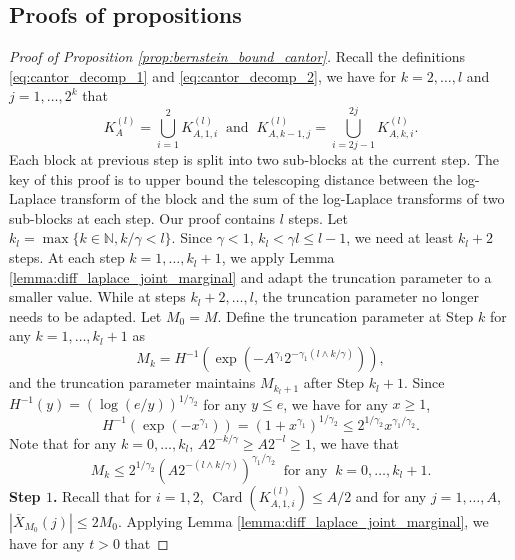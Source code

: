 \documentclass[11pt]{article}
\DeclareMathOperator*{\card}{Card}
\theoremstyle{plain}
\theoremstyle{definition}
\begin{document}
\subsection{Proofs of propositions}
\begin{proof}[Proof of Proposition \ref{prop:bernstein_bound_cantor}]
    Recall the definitions \eqref{eq:cantor_decomp_1} and \eqref{eq:cantor_decomp_2}, we have for $k = 2, \dots, l$ and $j = 1, \dots, 2^k$ that
    \begin{equation*}
    K_A^{(l)} = \bigcup_{i=1}^{2}K_{A,1,i}^{(l)} \;\; \text{and} \;\; K_{A,k-1,j}^{(l)} = \bigcup_{i = 2j-1}^{2j}K_{A,k,i}^{(l)}.
    \end{equation*}
    Each block at previous step is split into two sub-blocks at the current step. The key of this proof is to upper bound the telescoping distance between the log-Laplace transform of the block and the sum of the log-Laplace transforms of two sub-blocks at each step. Our proof contains $l$ steps. Let $k_l = \max\{k \in \mathbb{N}, k/\gamma < l\}$. Since $\gamma < 1$, $k_l < \gamma l \leq l-1$, we need at least $k_l + 2$ steps. At each step $k = 1, \dots, k_l+1$, we apply Lemma \ref{lemma:diff_laplace_joint_marginal} and adapt the truncation parameter to a smaller value. While at steps $k_l + 2, \dots, l$, the truncation parameter no longer needs to be adapted.
    Let $M_0 = M$. Define the truncation parameter at Step $k$ for any $k = 1, \dots, k_l+1$ as
    \begin{equation*}
        M_k = H^{-1}(\exp(-A^{\gamma_1}2^{-\gamma_1(l \wedge k/\gamma)})),
    \end{equation*}
    and the truncation parameter maintains $M_{k_l+1}$ after Step $k_l+1$.
    Since $H^{-1}(y) = (\log(e/y))^{1/\gamma_2}$ for any $y \leq e$, we have for any $x \geq 1$,
    \begin{equation}\label{eq:property_H^-1}
        H^{-1}(\exp(-x^{\gamma_1})) = (1 + x^{\gamma_1})^{1/\gamma_2} \leq 2^{1/\gamma_2}x^{\gamma_1/\gamma_2}.
    \end{equation}
    Note that for any $k = 0, \dots, k_l$, $A2^{-k/\gamma} \geq A2^{-l} \geq 1$, we have that
    \begin{equation}\label{eq:mj_ub}
        M_k \leq 2^{1/\gamma_2}(A2^{-(l \wedge k/\gamma)})^{\gamma_1/\gamma_2} \;\; \text{for any} \;\; k = 0, \dots, k_l+1.
    \end{equation}
    \textbf{Step $1$.}
    Recall that for $i = 1, 2$, $\card(K_{A,1,i}^{(l)}) \leq A/2$ and for any $j = 1, \dots, A$, $|\overline{X}_{M_0}(j)| \leq 2M_0$. Applying Lemma \ref{lemma:diff_laplace_joint_marginal}, we have for any $t > 0$ that

\end{proof}
\end{document}

